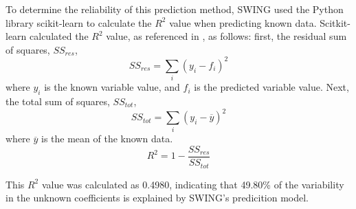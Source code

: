 \documentclass[journal,twoside,web]{ieeecolor}
\begin{document}
To determine the reliability of this prediction method, SWING used the Python library scikit-learn\cite{b7} 
to calculate the $R^2$ value when predicting known data. Scitkit-learn calculated the $R^2$ value, as referenced in \cite{b7}, as follows:
first, the residual sum of squares, $SS_{res}$,
\begin{equation}
    \label{eq:ResidSumSquares}
    SS_{res} = \sum_{i}{(y_i-f_i)^2}
\end{equation}
where $y_i$ is the known variable value, and $f_i$ is the predicted variable value.
Next, the total sum of squares, $SS_{tot}$,
\begin{equation}
    \label{eq:TotSumSquares}
    SS_{tot} = \sum_{i}{(y_i-\overline{y})^2}
\end{equation}
where $\overline{y}$ is the mean of the known data.
\begin{equation}
    \label{eq:CoeffDeterm}
    R^2 = 1 - \frac{SS_{res}}{SS_{tot}}
\end{equation}

This $R^2$ value was calculated as 0.4980, indicating that 49.80\% of the variability in the unknown coefficients is 
explained by SWING's predicition model.
\end{document}
